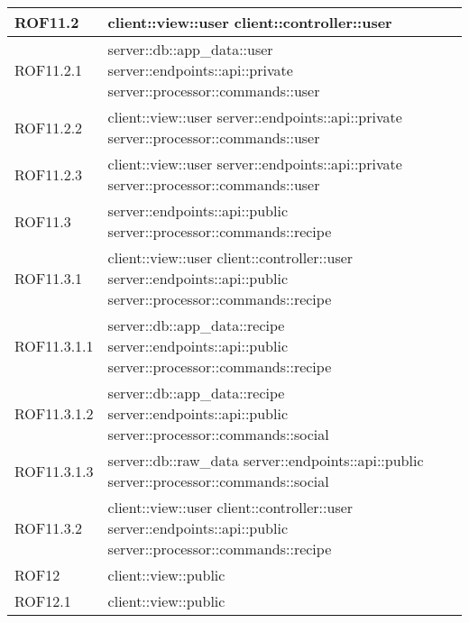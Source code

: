 \begin{center}
\begin{longtable}{| p{4cm} | p{8cm} |}
\hline
ROF11.2 & client::view::user \newline client::controller::user \\
\hline
ROF11.2.1 & server::db::app\_data::user \newline server::endpoints::api::private \newline server::processor::commands::user \\
\hline
ROF11.2.2 & client::view::user \newline server::endpoints::api::private \newline server::processor::commands::user \\
\hline
ROF11.2.3 & client::view::user \newline server::endpoints::api::private \newline server::processor::commands::user \\
\hline
ROF11.3 & server::endpoints::api::public \newline server::processor::commands::recipe \\
\hline
ROF11.3.1 & client::view::user \newline client::controller::user \newline server::endpoints::api::public \newline server::processor::commands::recipe \\
\hline
ROF11.3.1.1 & server::db::app\_data::recipe \newline server::endpoints::api::public \newline server::processor::commands::recipe \\
\hline
ROF11.3.1.2 & server::db::app\_data::recipe \newline server::endpoints::api::public \newline server::processor::commands::social \\
\hline
ROF11.3.1.3 & server::db::raw\_data \newline server::endpoints::api::public \newline server::processor::commands::social \\
\hline
ROF11.3.2 & client::view::user \newline client::controller::user \newline server::endpoints::api::public \newline server::processor::commands::recipe \\
\hline
ROF12 & client::view::public \\
\hline
ROF12.1 & client::view::public \\

\end{longtable}
\end{center}
